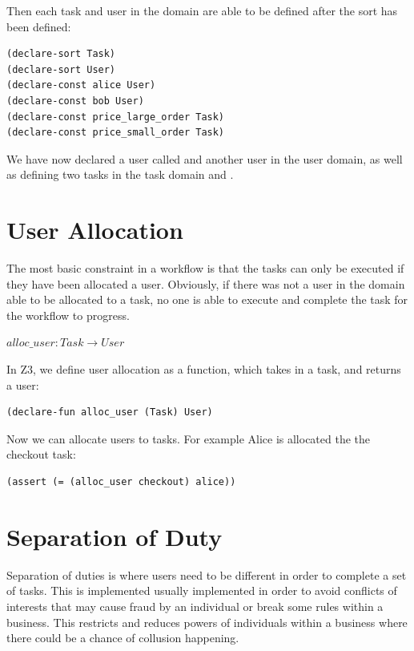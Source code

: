 \documentclass[a4paper]{report}
\begin{document}
Then each task and user in the domain are able to be defined after the sort has been defined: 
\lstset{numbers=left, showspaces=false,
    showstringspaces=false, tabsize=2, breaklines=true,
    xleftmargin=5.0ex,
}
\lstset{basicstyle=\ttfamily}
\begin{lstlisting}[frame=single]
(declare-sort Task)
(declare-sort User)
(declare-const alice User)
(declare-const bob User)
(declare-const price_large_order Task)
(declare-const price_small_order Task)
\end{lstlisting}
We have now declared a user called  and another user  in the user domain, as well as defining two tasks in the task domain  and . 

\section{User Allocation}
The most basic constraint in a workflow is that the tasks can only be executed if they have been allocated a user. Obviously, if there was not a user in the domain able to be allocated to a task, no one is able to execute and complete the task for the workflow to progress.
\begin{center}
$alloc\_user : Task \rightarrow User$
\end{center}
In Z3, we define user allocation as a function, which takes in a task, and returns a user:
\begin{lstlisting}[frame=single]
(declare-fun alloc_user (Task) User)
\end{lstlisting}

Now we can allocate users to tasks. For example Alice is allocated the the checkout task:
\begin{lstlisting}[frame=single]
(assert (= (alloc_user checkout) alice))
\end{lstlisting}

\section{Separation of Duty}
Separation of duties\cite{sod} is where users need to be different in order to complete a set of tasks. This is implemented usually implemented in order to avoid conflicts of interests that may cause fraud by an individual or break some rules within a business. This restricts and reduces powers of individuals within a business where there could be a chance of collusion happening. \\
\end{document}
